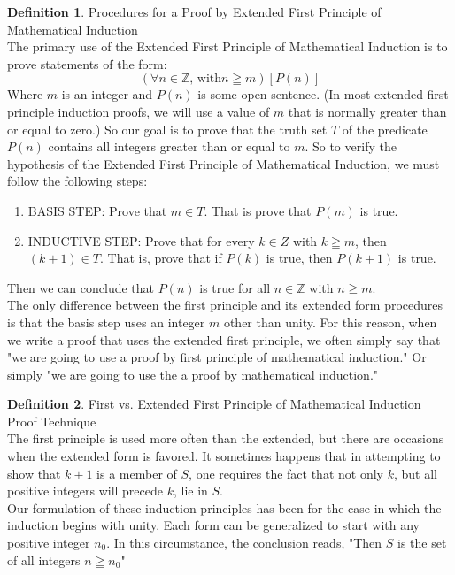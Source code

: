 \documentclass{book}
\theoremstyle{definition}
\newtheorem{definition}{Definition}[section]
\theoremstyle{remark}
\newcommand{\bb}[1]{\mathbb{#1}}
\begin{document}
\newpage
\begin{definition}
Procedures for a Proof by Extended First Principle of Mathematical Induction \\

The primary use of the Extended First Principle of Mathematical Induction is to prove statements of the form: 
    \begin{equation*}
        (\forall n \in \bb{Z} \text{, with} n \geqq m)[P(n)]
    \end{equation*}
Where $m$ is an integer and $P(n)$ is some open sentence. (In most extended first principle induction proofs, we will use a value of $m$ that is normally greater than or equal to zero.) So our goal is to prove that the truth set $T$ of the predicate $P(n)$ contains all integers greater than or equal to $m$. So to verify the hypothesis of the Extended First Principle of Mathematical Induction, we must follow the following steps:

    \begin{enumerate}
        \item BASIS STEP: Prove that $m \in T$. That is prove that $P(m)$ is true.
        \item INDUCTIVE STEP: Prove that for every $k \in Z$ with $k \geqq m$, then $(k+1) \in T$. That is, prove that if $P(k)$ is true, then $P(k+1)$ is true.
    \end{enumerate}
Then we can conclude that $P(n)$ is true for all $n \in \bb{Z}$ with $n \geqq m$. \\

The only difference between the first principle and its extended form procedures is that the 
basis step uses an integer $m$ other than unity. For this reason, when we write a proof that uses the extended first principle, we often simply say that "we are going to use a proof by first principle of mathematical induction." Or simply "we are going to use the a proof by mathematical induction."
\end{definition}


\begin{definition}
First vs. Extended First Principle of Mathematical Induction Proof Technique \\

The first principle is used more often than the extended, but there are occasions when the extended form is favored. It sometimes happens that in attempting to show that $k+1$ is a member of $S$, one requires the fact that not only $k$, but all positive integers will precede $k$, lie in $S$. \\

Our formulation of these induction principles has been for the case in which the induction begins with unity. Each form can be generalized to start with any positive integer $n_0$. In this circumstance, the conclusion reads, "Then $S$ is the set of all integers $n \geqq n_0$" \\

\end{definition}
\end{document}
